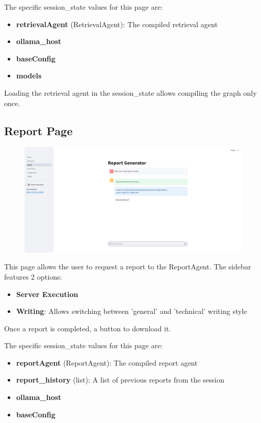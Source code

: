 \documentclass[11pt,a4paper]{report}
\begin{document}
The specific session\_state values for this page are:
\begin{itemize}
    \item \textbf{retrievalAgent} (RetrievalAgent): The compiled retrieval agent
    \item \textbf{ollama\_host}
    \item \textbf{baseConfig}
    \item \textbf{models}
\end{itemize}

Loading the retrieval agent in the session\_state allows compiling the graph only once.

\subsection{Report Page}

\begin{figure}[H]
    \centering
    \includegraphics[width=1\linewidth]{static/figures/reportPage.png}
    \label{fig:reportPage}
\end{figure}

This page allows the user to request a report to the ReportAgent. The sidebar features 2 options:

\begin{itemize}
    \item \textbf{Server Execution}
    \item \textbf{Writing}: Allows switching between 'general' and 'technical' writing style
\end{itemize}

Once a report is completed, a button to download it.

The specific session\_state values for this page are:
\begin{itemize}
    \item \textbf{reportAgent} (ReportAgent): The compiled report agent
    \item \textbf{report\_history} (list): A list of previous reports from the session
    \item \textbf{ollama\_host}
    \item \textbf{baseConfig}
\end{itemize}
\end{document}
